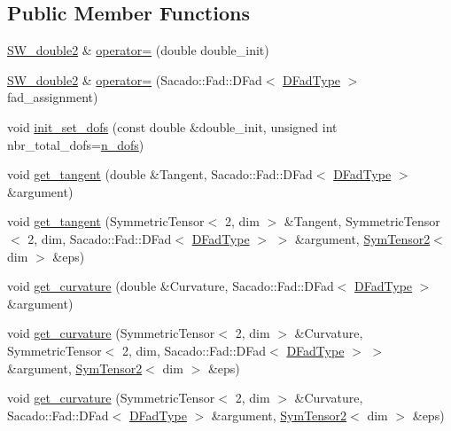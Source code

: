 \subsection*{Public Member Functions}
\begin{DoxyCompactItemize}
\item 
\hyperlink{classSacado__Wrapper_1_1SW__double2}{S\+W\+\_\+double2} \& \hyperlink{classSacado__Wrapper_1_1SW__double2_a6f0538f891bd49efa54cc508da477f2e}{operator=} (double double\+\_\+init)
\item 
\hyperlink{classSacado__Wrapper_1_1SW__double2}{S\+W\+\_\+double2} \& \hyperlink{classSacado__Wrapper_1_1SW__double2_a426ab490411a347540e5af7028638495}{operator=} (Sacado\+::\+Fad\+::\+D\+Fad$<$ \hyperlink{Sacado__Wrapper_8h_a7e0893207b87dad05c66a34baac8ed2e}{D\+Fad\+Type} $>$ fad\+\_\+assignment)
\item 
void \hyperlink{classSacado__Wrapper_1_1SW__double2_af633ef0195198f1fed2bb44106af33c5}{init\+\_\+set\+\_\+dofs} (const double \&double\+\_\+init, unsigned int nbr\+\_\+total\+\_\+dofs=\hyperlink{classSacado__Wrapper_1_1SW__double2_a535aa77392e896e21151bfc63f92e020}{n\+\_\+dofs})
\item 
void \hyperlink{classSacado__Wrapper_1_1SW__double2_ad51ba1e79171d60861b28098dfef903d}{get\+\_\+tangent} (double \&Tangent, Sacado\+::\+Fad\+::\+D\+Fad$<$ \hyperlink{Sacado__Wrapper_8h_a7e0893207b87dad05c66a34baac8ed2e}{D\+Fad\+Type} $>$ \&argument)
\item 
void \hyperlink{classSacado__Wrapper_1_1SW__double2_a9ee087929024da3da05268d5d0d4964b}{get\+\_\+tangent} (Symmetric\+Tensor$<$ 2, dim $>$ \&Tangent, Symmetric\+Tensor$<$ 2, dim, Sacado\+::\+Fad\+::\+D\+Fad$<$ \hyperlink{Sacado__Wrapper_8h_a7e0893207b87dad05c66a34baac8ed2e}{D\+Fad\+Type} $>$ $>$ \&argument, \hyperlink{classSacado__Wrapper_1_1SymTensor2}{Sym\+Tensor2}$<$ dim $>$ \&eps)
\item 
void \hyperlink{classSacado__Wrapper_1_1SW__double2_a7d3f3a21cd842645af9861bf50308825}{get\+\_\+curvature} (double \&Curvature, Sacado\+::\+Fad\+::\+D\+Fad$<$ \hyperlink{Sacado__Wrapper_8h_a7e0893207b87dad05c66a34baac8ed2e}{D\+Fad\+Type} $>$ \&argument)
\item 
void \hyperlink{classSacado__Wrapper_1_1SW__double2_a21da9eedb0c0e0d7db441426a5519a1a}{get\+\_\+curvature} (Symmetric\+Tensor$<$ 2, dim $>$ \&Curvature, Symmetric\+Tensor$<$ 2, dim, Sacado\+::\+Fad\+::\+D\+Fad$<$ \hyperlink{Sacado__Wrapper_8h_a7e0893207b87dad05c66a34baac8ed2e}{D\+Fad\+Type} $>$ $>$ \&argument, \hyperlink{classSacado__Wrapper_1_1SymTensor2}{Sym\+Tensor2}$<$ dim $>$ \&eps)
\item 
void \hyperlink{classSacado__Wrapper_1_1SW__double2_ac99cef52c5af3c6516aecf940275c595}{get\+\_\+curvature} (Symmetric\+Tensor$<$ 2, dim $>$ \&Curvature, Sacado\+::\+Fad\+::\+D\+Fad$<$ \hyperlink{Sacado__Wrapper_8h_a7e0893207b87dad05c66a34baac8ed2e}{D\+Fad\+Type} $>$ \&argument, \hyperlink{classSacado__Wrapper_1_1SymTensor2}{Sym\+Tensor2}$<$ dim $>$ \&eps)
\end{DoxyCompactItemize}
